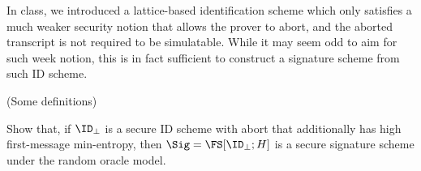 \begin{problem}\label{p2}
    \leavevmode\par
    In class, we introduced a lattice-based identification scheme which only satisfies a much weaker security notion that allows the prover to abort, and the aborted transcript is not required to be simulatable. While it may seem odd to aim for such week notion, this is in fact sufficient to construct a signature scheme from such ID scheme.

    \noindent (Some definitions)

    Show that, if $\ID_\bot$ is a secure ID scheme with abort that additionally has high first-message min-entropy, then $\Sig = \FS[\ID_\bot; H]$ is a secure signature scheme under the random oracle model.
\end{problem}




